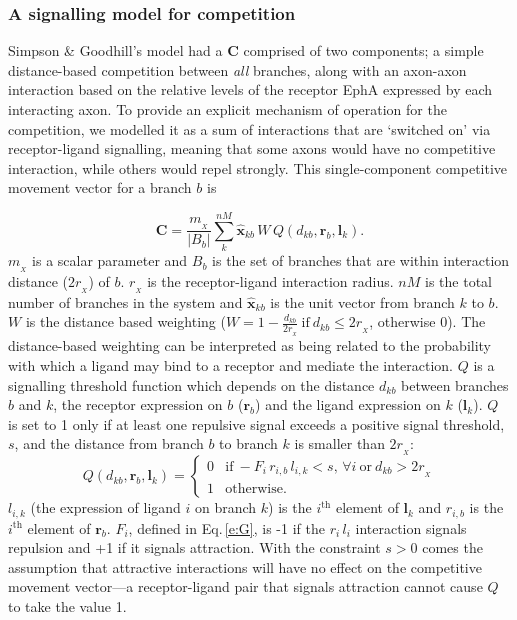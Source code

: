 \documentclass[9pt,lineno,draft]{elife}
\begin{document}
\subsubsection*{A signalling model for competition}

Simpson \& Goodhill's model had a $\mathbf{C}$ comprised of two components; a simple distance-based competition between \emph{all} branches, along with an axon-axon interaction based on the relative levels of the receptor EphA expressed by each interacting axon.
To provide an explicit mechanism of operation for the competition, we modelled it as a sum of interactions that are `switched on' via receptor-ligand signalling, meaning that some axons would have no competitive interaction, while others would repel strongly.
This single-component competitive movement vector for a branch $b$ is

\begin{equation} \label{e:X}
\mathbf{C} = \frac{m_{\!_X}}{|B_{b}|} \sum_k^{nM} \hat{\mathbf{x}}_{kb}\,W\,Q(d_{kb}, \mathbf{r}_{b}, \mathbf{l}_{k}).
\end{equation}
%
$m_{\!_X}$ is a scalar parameter and $B_{b}$ is the set of branches that are within interaction distance ($2 r_{\!_X}$) of $b$. $r_{\!_X}$ is the receptor-ligand interaction radius. $nM$ is the total number of branches in the system and $\hat{\mathbf{x}}_{kb}$ is the unit vector from branch $k$ to $b$.
%
$W$ is the distance based weighting ($W = 1-\frac{d_{kb}}{2r_{\!_X}}~\mathrm{if}~  d_{kb}\leq 2r_{\!_X}$, otherwise $0$).
%
The distance-based weighting can be interpreted as being related to the probability with which a ligand may bind to a receptor and mediate the interaction.
%
$Q$ is a signalling threshold function which depends on the distance $d_{kb}$ between branches $b$ and $k$, the receptor expression on $b$ ($\mathbf{r}_b$) and the ligand expression on $k$ ($\mathbf{l}_k$).
$Q$ is set to 1 only if at least one repulsive signal exceeds a positive signal threshold, $s$, and the distance from branch $b$ to branch $k$ is smaller than $2 r_{\!_X}$:
%
\begin{equation}
Q(d_{kb}, \mathbf{r}_{b}, \mathbf{l}_{k}) = \begin{cases}
                 0 & \mathrm{if}~-F_i\,r_{i,b}\,l_{i,k} <
                 s,\,\forall{i}~\mathrm{or}~d_{kb} > 2r_{\!_X} \\
                 1 & \mathrm{otherwise.}
     \end{cases}
\end{equation}
%
$l_{i,k}$ (the expression of ligand $i$ on branch $k$) is the $i^{\mathrm{th}}$ element of $\mathbf{l}_k$ and $r_{i,b}$ is the $i^{\mathrm{th}}$ element of $\mathbf{r}_b$.
$F_i$, defined in Eq.\,\ref{e:G}, is -1 if the $r_{i}\,l_{i}$ interaction signals repulsion and +1 if it signals attraction.
With the constraint $s>0$ comes the assumption that attractive interactions will have no effect on the competitive movement vector---a receptor-ligand pair that signals attraction cannot cause $Q$ to take the value 1.
\end{document}
